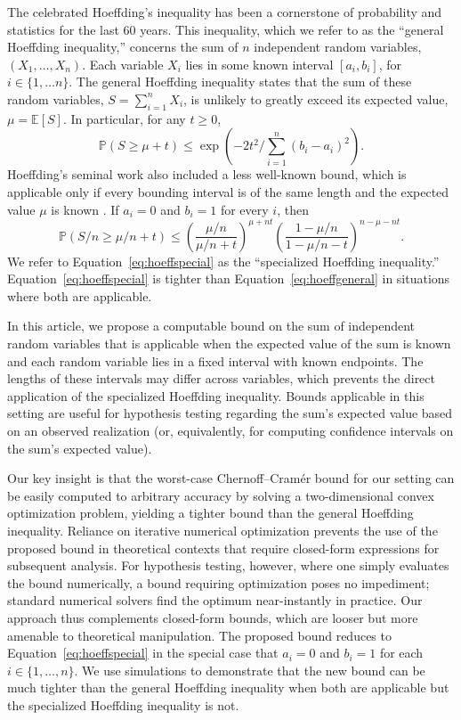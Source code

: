 \documentclass[12pt]{article}
\theoremstyle{plain}
\begin{document}
The celebrated Hoeffding's inequality \citep[Theorem 2]{hoeffding_probability_1963} has been a cornerstone of probability and statistics for the last 60 years.  This inequality, which we refer to as the ``general Hoeffding inequality,'' concerns the sum of $n$ independent random variables, $(X_1,\ldots, X_n)$.  Each variable $X_i$ lies in some known interval $[a_i,b_i]$, for $i\in \{1,\ldots n\}$.  The general Hoeffding inequality states that the sum of these random variables, $S=\sum_{i=1}^n X_i$, is unlikely to greatly exceed its expected value, $\mu=\mathbb{E}[S]$.  In particular, for any $t\geq 0$,
\begin{equation} \label{eq:hoeffgeneral}
\mathbb{P}(S \geq \mu+t) \leq \exp\left(-2t^2 / \sum_{i=1}^n (b_i-a_i)^2 \right).
\end{equation}
Hoeffding's seminal work also included a less well-known bound, which is applicable only if every bounding interval is of the same length and the expected value $\mu$ is known \citep[Theorem 1]{hoeffding_probability_1963}.  If $a_i=0$ and $b_i=1$ for every $i$, then
\begin{equation} \label{eq:hoeffspecial}
\mathbb{P}(S/n \geq \mu/n+t) \leq \left(\frac{\mu/n}{\mu/n+t}\right)^{\mu+nt} \left(\frac{1-\mu/n}{1-\mu/n-t}\right)^{n-\mu-nt}.
\end{equation}
We refer to Equation~\ref{eq:hoeffspecial} as the ``specialized Hoeffding inequality.'' Equation~\ref{eq:hoeffspecial} is tighter than Equation~\ref{eq:hoeffgeneral} in situations where both are applicable.

In this article, we propose a computable bound on the sum of independent random variables that is applicable when the expected value of the sum is known and each random variable lies in a fixed interval with known endpoints.  The lengths of these intervals may differ across variables, which prevents the direct application of the specialized Hoeffding inequality.  Bounds applicable in this setting are useful for hypothesis testing regarding the sum's expected value based on an observed realization (or, equivalently, for computing confidence intervals on the sum's expected value).

Our key insight is that the worst-case Chernoff--Cram\'er bound for our setting can be easily computed to arbitrary accuracy by solving a two-dimensional convex optimization problem, yielding a tighter bound than the general Hoeffding inequality.  Reliance on iterative numerical optimization prevents the use of the proposed bound in theoretical contexts that require closed-form expressions for subsequent analysis.  For hypothesis testing, however, where one simply evaluates the bound numerically, a bound requiring optimization poses no impediment; standard numerical solvers find the optimum near-instantly in practice.  Our approach thus complements closed-form bounds, which are looser but more amenable to theoretical manipulation.  The proposed bound reduces to Equation~\ref{eq:hoeffspecial} in the special case that $a_i=0$ and $b_i=1$ for each $i \in \{1,\ldots,n\}$.  We use simulations to demonstrate that the new bound can be much tighter than the general Hoeffding inequality when both are applicable but the specialized Hoeffding inequality is not.
\end{document}
